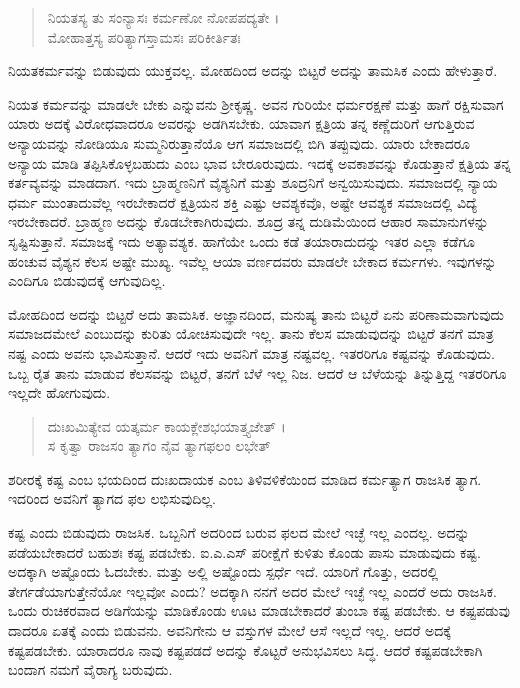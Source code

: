 \begin{verse}
ನಿಯತಸ್ಯ ತು ಸಂನ್ಯಾಸಃ ಕರ್ಮಣೋ ನೋಪಪದ್ಯತೇ ।\\ಮೋಹಾತ್ತಸ್ಯ ಪರಿತ್ಯಾಗಸ್ತಾಮಸಃ ಪರಿಕೀರ್ತಿತಃ 
\end{verse}

{\small ನಿಯತಕರ್ಮವನ್ನು ಬಿಡುವುದು ಯುಕ್ತವಲ್ಲ. ಮೋಹದಿಂದ ಅದನ್ನು ಬಿಟ್ಟರೆ ಅದನ್ನು ತಾಮಸಿಕ ಎಂದು ಹೇಳುತ್ತಾರೆ.}

ನಿಯತ ಕರ್ಮವನ್ನು ಮಾಡಲೇ ಬೇಕು ಎನ್ನುವನು ಶ್ರೀಕೃಷ್ಣ. ಅವನ ಗುರಿಯೇ ಧರ್ಮರಕ್ಷಣೆ ಮತ್ತು ಹಾಗೆ ರಕ್ಷಿಸುವಾಗ ಯಾರು ಅದಕ್ಕೆ ವಿರೋಧವಾದರೂ ಅವರನ್ನು ಅಡಗಿಸಬೇಕು. ಯಾವಾಗ ಕ್ಷತ್ರಿಯ ತನ್ನ ಕಣ್ಣೆದುರಿಗೆ ಆಗುತ್ತಿರುವ ಅನ್ಯಾಯವನ್ನು ನೋಡಿಯೂ ಸುಮ್ಮನಿರುತ್ತಾನೆಯೊ ಆಗ ಸಮಾಜದಲ್ಲಿ ಬಿಗಿ ತಪ್ಪುವುದು. ಯಾರು ಬೇಕಾದರೂ ಅನ್ಯಾಯ ಮಾಡಿ ತಪ್ಪಿಸಿಕೊಳ್ಳಬಹುದು ಎಂಬ ಭಾವ ಬೇರೂರುವುದು. ಇದಕ್ಕೆ ಅವಕಾಶವನ್ನು ಕೊಡುತ್ತಾನೆ ಕ್ಷತ್ರಿಯ ತನ್ನ ಕರ್ತವ್ಯವನ್ನು ಮಾಡದಾಗ. ಇದು ಬ್ರಾಹ್ಮಣನಿಗೆ ವೈಶ್ಯನಿಗೆ ಮತ್ತು ಶೂದ್ರನಿಗೆ ಅನ್ವಯಿಸುವುದು. ಸಮಾಜದಲ್ಲಿ ನ್ಯಾಯ ಧರ್ಮ ಮುಂತಾದುವೆಲ್ಲ ಇರಬೇಕಾದರೆ ಕ್ಷತ್ರಿಯನ ಶಕ್ತಿ ಎಷ್ಟು ಆವಶ್ಯಕವೊ, ಅಷ್ಟೇ ಆವಶ್ಯಕ ಸಮಾಜದಲ್ಲಿ ವಿದ್ಯೆ ಇರಬೇಕಾದರೆ. ಬ್ರಾಹ್ಮಣ ಅದನ್ನು ಕೊಡಬೇಕಾಗಿರುವುದು. ಶೂದ್ರ ತನ್ನ ದುಡಿಮೆಯಿಂದ ಆಹಾರ ಸಾಮಾನುಗಳನ್ನು ಸೃಷ್ಟಿಸುತ್ತಾನೆ. ಸಮಾಜಕ್ಕೆ ಇದು ಅತ್ಯಾವಶ್ಯಕ. ಹಾಗೆಯೇ ಒಂದು ಕಡೆ ತಯಾರಾದುದನ್ನು ಇತರ ಎಲ್ಲಾ ಕಡೆಗೂ ಹಂಚುವ ವೈಶ್ಯನ ಕೆಲಸ ಅಷ್ಟೇ ಮುಖ್ಯ. ಇವೆಲ್ಲ ಆಯಾ ವರ್ಣದವರು ಮಾಡಲೇ ಬೇಕಾದ ಕರ್ಮಗಳು. ಇವುಗಳನ್ನು ಎಂದಿಗೂ ಬಿಡುವುದಕ್ಕೆ ಆಗುವುದಿಲ್ಲ.

ಮೋಹದಿಂದ ಅದನ್ನು ಬಿಟ್ಟರೆ ಅದು ತಾಮಸಿಕ. ಅಜ್ಞಾನದಿಂದ, ಮನುಷ್ಯ ತಾನು ಬಿಟ್ಟರೆ ಏನು ಪರಿಣಾಮವಾಗುವುದು ಸಮಾಜದಮೇಲೆ ಎಂಬುದನ್ನು ಕುರಿತು ಯೋಚಿಸುವುದೇ ಇಲ್ಲ. ತಾನು ಕೆಲಸ ಮಾಡುವುದನ್ನು ಬಿಟ್ಟರೆ ತನಗೆ ಮಾತ್ರ ನಷ್ಟ ಎಂದು ಅವನು ಭಾವಿಸುತ್ತಾನೆ. ಆದರೆ ಇದು ಅವನಿಗೆ ಮಾತ್ರ ನಷ್ಟವಲ್ಲ. ಇತರರಿಗೂ ಕಷ್ಟವನ್ನು ಕೊಡುವುದು. ಒಬ್ಬ ರೈತ ತಾನು ಮಾಡುವ ಕೆಲಸವನ್ನು ಬಿಟ್ಟರೆ, ತನಗೆ ಬೆಳೆ ಇಲ್ಲ ನಿಜ. ಆದರೆ ಆ ಬೆಳೆಯನ್ನು ತಿನ್ನುತ್ತಿದ್ದ ಇತರರಿಗೂ ಇಲ್ಲದೇ ಹೋಗುವುದು.

\begin{verse}
ದುಃಖಮಿತ್ಯೇವ ಯತ್ಕರ್ಮ ಕಾಯಕ್ಲೇಶಭಯಾತ್ತ್ಯಜೇತ್ ।\\ಸ ಕೃತ್ವಾ ರಾಜಸಂ ತ್ಯಾಗಂ ನೈವ ತ್ಯಾಗಫಲಂ ಲಭೇತ್ 
\end{verse}

{\small ಶರೀರಕ್ಕೆ ಕಷ್ಟ ಎಂಬ ಭಯದಿಂದ ದುಃಖದಾಯಕ ಎಂಬ ತಿಳಿವಳಿಕೆಯಿಂದ ಮಾಡಿದ ಕರ್ಮತ್ಯಾಗ ರಾಜಸಿಕ ತ್ಯಾಗ. ಇದರಿಂದ ಅವನಿಗೆ ತ್ಯಾಗದ ಫಲ ಲಭಿಸುವುದಿಲ್ಲ.}

ಕಷ್ಟ ಎಂದು ಬಿಡುವುದು ರಾಜಸಿಕ. ಒಬ್ಬನಿಗೆ ಅದರಿಂದ ಬರುವ ಫಲದ ಮೇಲೆ ಇಚ್ಛೆ ಇಲ್ಲ ಎಂದಲ್ಲ. ಅದನ್ನು ಪಡೆಯಬೇಕಾದರೆ ಬಹುಶಃ ಕಷ್ಟ ಪಡಬೇಕು. ಐ.ಎ.ಎಸ್ ಪರೀಕ್ಷೆಗೆ ಕುಳಿತು ಕೊಂಡು ಪಾಸು ಮಾಡುವುದು ಕಷ್ಟ. ಅದಕ್ಕಾಗಿ ಅಷ್ಟೊಂದು ಓದಬೇಕು. ಮತ್ತು ಅಲ್ಲಿ ಅಷ್ಟೊಂದು ಸ್ಪರ್ಧೆ ಇದೆ. ಯಾರಿಗೆ ಗೊತ್ತು, ಅದರಲ್ಲಿ ತೇರ್ಗಡೆಯಾಗುತ್ತೇನೆಯೋ ಇಲ್ಲವೋ ಎಂದು? ಅದಕ್ಕಾಗಿ ನನಗೆ ಅದರ ಮೇಲೆ ಇಚ್ಛೆ ಇಲ್ಲ ಎಂದರೆ ಅದು ರಾಜಸಿಕ. ಒಂದು ರುಚಿಕರವಾದ ಅಡಿಗೆಯನ್ನು ಮಾಡಿಕೊಂಡು ಊಟ ಮಾಡಬೇಕಾದರೆ ತುಂಬಾ ಕಷ್ಟ ಪಡಬೇಕು. ಆ ಕಷ್ಟಪಡುವು ದಾದರೂ ಏತಕ್ಕೆ ಎಂದು ಬಿಡುವನು. ಅವನಿಗೇನು ಆ ವಸ್ತುಗಳ ಮೇಲೆ ಆಸೆ ಇಲ್ಲದೆ ಇಲ್ಲ. ಆದರೆ ಅದಕ್ಕೆ ಕಷ್ಟಪಡಬೇಕು. ಯಾರಾದರೂ ನಾವು ಕಷ್ಟಪಡದೆ ಅದನ್ನು ಕೊಟ್ಟರೆ ಅನುಭವಿಸಲು ಸಿದ್ಧ. ಆದರೆ ಕಷ್ಟಪಡಬೇಕಾಗಿ ಬಂದಾಗ ನಮಗೆ ವೈರಾಗ್ಯ ಬರುವುದು.

